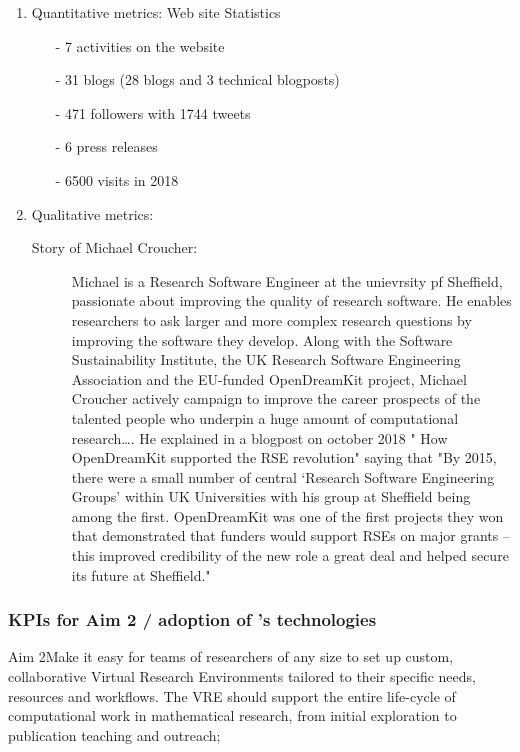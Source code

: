 \begin{enumerate}
\item Quantitative metrics: Web site Statistics
\begin{itemize}
\item[-] 7 activities on the website 
\item[-] 31 blogs (28 blogs and 3 technical blogposts)
\item[-] 471 followers with 1744 tweets
\item[-] 6 press releases
\item[-] 6500 visits in 2018
\end{itemize}
\item Qualitative metrics:
\begin{description}
\item [Story of Michael Croucher:] Michael is a Research Software Engineer at the unievrsity pf Sheffield, passionate about improving the 
quality of research software. He enables researchers to ask larger and more complex research questions by improving the software they 
develop. Along with the Software Sustainability Institute, the UK Research Software Engineering Association and the EU-funded OpenDreamKit 
project, Michael Croucher actively campaign to improve the career prospects of the talented people who underpin a huge amount of 
computational research…. He explained in a blogpost on october 2018 " How OpenDreamKit supported the RSE revolution" saying that "By 2015, 
there were a small number of central ‘Research Software Engineering Groups’ within UK Universities with his group at Sheffield  being among 
the first. OpenDreamKit was one of the first projects they won that demonstrated that funders would support RSEs on major grants – this 
improved credibility of the new role a great deal and helped secure its future at Sheffield." 
\end{description}
\end{enumerate}

\subsubsection{KPIs for Aim 2 / adoption of \ODK's technologies}

\begin{recommendation}{Aim 2}Make it easy for teams of researchers of any size to set up custom, collaborative Virtual Research Environments 
tailored to their specific needs, resources and workflows. The VRE should support the entire life-cycle of computational work in 
mathematical research, from initial exploration to publication teaching and outreach;
\end{recommendation}

